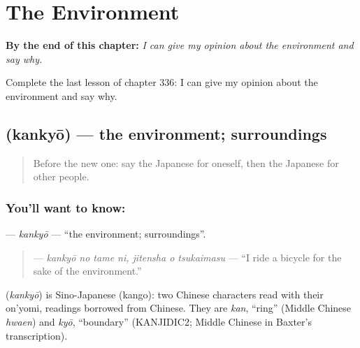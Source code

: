 
\chapter{The Environment}
\label{ch:ja-the-environment}

\begin{chapteropening}
\textbf{By the end of this chapter:} \emph{I can give my opinion about the environment and say why.}

Complete the last lesson of chapter 336: I can give my opinion about the environment and say why.
\end{chapteropening}

\section[\texorpdfstring{\ja{かんきょう} (kankyō)}{かんきょう (kankyō)}]{ (kankyō) — the environment; surroundings}

\label{lesson:JA-C336-kankyou}



\begin{quote}
Before the new one: say the Japanese for oneself, then the Japanese for other people.
\end{quote}

\subsection*{You'll want to know: }
\textbf{} — \emph{kankyō} — \textquotedblleft{}the environment; surroundings\textquotedblright{}.

\begin{quote}
\textbf{  } — \emph{kankyō no tame ni, jitensha o tsukaimasu} — \textquotedblleft{}I ride a bicycle for the sake of the environment.\textquotedblright{}
\end{quote}

\begin{cousinweb}
\textbf{} (\emph{kankyō}) is Sino-Japanese (kango): two Chinese characters read with their on'yomi, readings borrowed from Chinese. They are \emph{kan}, \textquotedblleft{}ring\textquotedblright{} (Middle Chinese \emph{hwaen}) and \emph{kyō}, \textquotedblleft{}boundary\textquotedblright{} (KANJIDIC2; Middle Chinese in Baxter's transcription).
\end{cousinweb}

